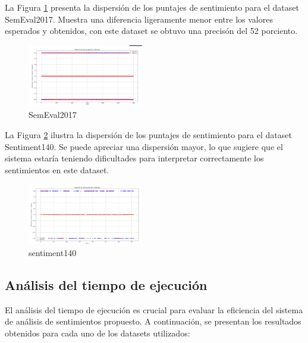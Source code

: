 \documentclass[sigconf, review=false, nonacm]{acmart}
\begin{document}
La Figura \ref{fig:semeval2017} presenta la dispersión de los puntajes de sentimiento para el dataset SemEval2017.
Muestra una diferencia ligeramente menor entre los valores esperados y obtenidos, con este dataset
se obtuvo una precisón del 52 porciento.
\begin{figure}[ht]
	\centering
	\includegraphics[width=0.45\textwidth]{../results/dispersion/semeval2017.png}
	\caption{SemEval2017}
	\label{fig:semeval2017}
\end{figure}

La Figura \ref{fig:sentiment140} ilustra la dispersión de los puntajes de sentimiento para el dataset Sentiment140.
Se puede apreciar una dispersión mayor, lo que sugiere que el sistema estaría teniendo 
dificultades para interpretar correctamente los sentimientos en este dataset.
\begin{figure}[ht]
	\centering
	\includegraphics[width=0.45\textwidth]{../results/dispersion/sentiment140.png}
	\caption{sentiment140}
	\label{fig:sentiment140}
\end{figure}

\subsection{Análisis del tiempo de ejecución}
El análisis del tiempo de ejecución es crucial para evaluar la eficiencia del sistema
de análisis de sentimientos propuesto. A continuación, se presentan los resultados obtenidos
para cada uno de los datasets utilizados:
\end{document}
